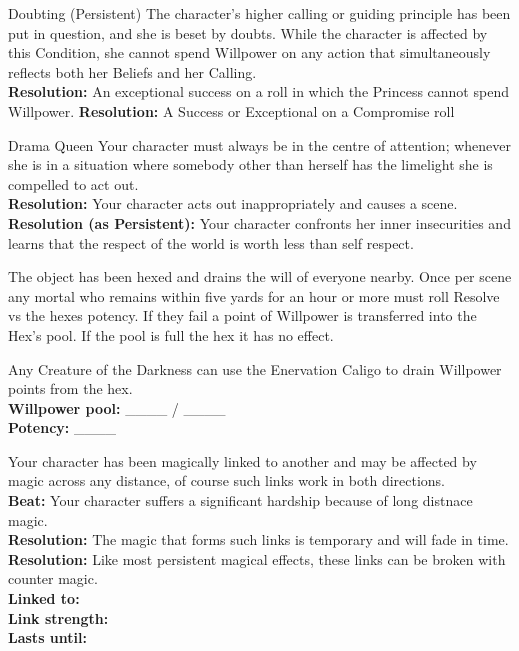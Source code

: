 \documentclass[10pt, frontgrid, backgrid]{flacards}
\begin{document}
\Cond
{Doubting (Persistent)}
{
The character’s higher calling or guiding principle has been put in question, and she is beset by doubts. While the character is affected by this Condition, she cannot spend Willpower on any action that simultaneously reflects both her Beliefs and her Calling.\\
\textbf{Resolution:} An exceptional success on a roll in which the Princess cannot spend Willpower. 
\textbf{Resolution:} A Success or Exceptional on a Compromise roll}

\Cond
{Drama Queen}
{Your character must always be in the centre of attention; whenever she is in a situation where somebody other than herself has the limelight she is compelled to act out. \\
\textbf{Resolution:} Your character acts out inappropriately and causes a scene.\\
\textbf{Resolution (as Persistent):} Your character confronts her inner insecurities and learns that the respect of the world is worth less than self respect. 
}

{The object has been hexed and drains the will of everyone nearby. Once per scene any mortal who remains within five yards for an hour or more must roll Resolve vs the hexes potency. If they fail a point of Willpower is transferred into the Hex's pool. If the pool is full the hex it has no effect. 

Any Creature of the Darkness can use the Enervation Caligo to drain Willpower points from the hex.\\

\textbf{Willpower pool:} \_\_\_\_ / \_\_\_\_\\
\textbf{Potency:} \_\_\_\_}

{Your character has been magically linked to another and may be affected by magic across any distance, of course such links work in both directions. \\
\textbf{Beat:} Your character suffers a significant hardship because of long distnace magic.\\
\textbf{Resolution:} The magic that forms such links is temporary and will fade in time. \\
\textbf{Resolution:} Like most persistent magical effects, these links can be broken with counter magic. \\
\textbf{Linked to:}\fillunderline \\
\textbf{Link strength:}\fillunderline \\
\textbf{Lasts until:}\fillunderline 
}
\end{document}
